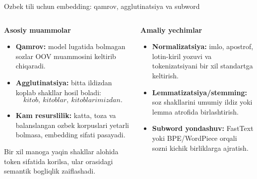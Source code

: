 \documentclass[aspectratio=169,11pt]{beamer}
\begin{document}
\begin{frame}{O\textquotesingle{}zbek tili uchun embedding: qamrov, agglutinatsiya va subword}
\footnotesize

\begin{columns}[T,totalwidth=\textwidth]
\begin{column}{0.48\textwidth}

\textbf{Asosiy muammolar}

\begin{itemize}\setlength\itemsep{5pt}
  \item \textbf{Qamrov:} model lug\textquotesingle{}atida bo\textquotesingle{}lmagan
        so\textquotesingle{}zlar OOV muammosini keltirib chiqaradi.
  \item \textbf{Agglutinatsiya:} bitta ildizdan ko\textquotesingle{}plab shakllar hosil bo\textquotesingle{}ladi:
        \[
        \textit{kitob},\ \textit{kitoblar},\ \textit{kitoblarimizdan}.
        \]
  \item \textbf{Kam resurslilik:} katta, toza va balanslangan o\textquotesingle{}zbek korpuslari
        yetarli bo\textquotesingle{}lmasa, embedding sifati pasayadi.
\end{itemize}

\vspace{3pt}

\begin{tcolorbox}[alertbox,left=2mm,right=2mm,top=1mm,bottom=1mm]
\scriptsize
Bir xil ma\textquotesingle{}noga yaqin shakllar alohida token sifatida ko\textquotesingle{}rilsa,
ular orasidagi semantik bog\textquotesingle{}liqlik zaiflashadi.
\end{tcolorbox}

\end{column}

\begin{column}{0.48\textwidth}

\textbf{Amaliy yechimlar}

\begin{itemize}\setlength\itemsep{5pt}
  \item \textbf{Normalizatsiya:} imlo, apostrof, lotin-kiril yozuvi va tokenizatsiyani
        bir xil standartga keltirish.
  \item \textbf{Lemmatizatsiya/stemming:} so\textquotesingle{}z shakllarini umumiy ildiz yoki
        lemma atrofida birlashtirish.
  \item \textbf{Subword yondashuv:} FastText yoki BPE/WordPiece orqali so\textquotesingle{}zni
        kichik birliklarga ajratish.
\end{itemize}


\end{column}
\end{columns}
\end{frame}
\end{document}

